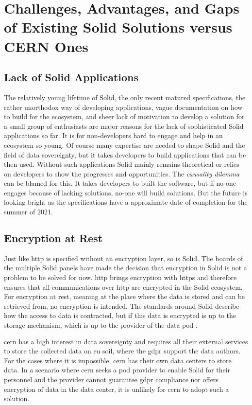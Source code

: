 \section{Challenges, Advantages, and Gaps of Existing Solid Solutions versus CERN Ones}

\subsection{Lack of Solid Applications}

The relatively young lifetime of Solid, the only recent matured specifications, the rather unorthodox way of developing applications, vague documentation on how to build for the ecosystem, and sheer lack of motivation to develop a solution for a small group of enthusiasts are major reasons for the lack of sophisticated Solid applications so far. It is for non-developers hard to engage and help in an ecosystem so young. Of course many expertise are needed to shape Solid and the field of data sovereignty, but it takes developers to build applications that can be then used. Without such applications Solid mainly remains theoretical or relies on developers to show the progresses and opportunities. The \textit{causality dilemma} can be blamed for this. It takes developers to built the software, but if no-one engages because of lacking solutions, no-one will build solutions. But the future is looking bright as the specifications have a approximate date of completion for the summer of 2021.

\subsection{Encryption at Rest}

Just like \gls{http} is specified without an encryption layer, so is Solid. The boards of the multiple Solid panels \cite{solid-panels} have made the decision that encryption in Solid is not a problem to be solved for now. \gls{http} brings encryption with \gls{https} and therefore ensures that all communications over \gls{http} are encrypted in the Solid ecosystem. For encryption at rest, meaning at the place where the data is stored and can be retrieved from, no encryption is intended. The standards around Solid describe how the access to data is contracted, but if this data is encrypted is up to the storage mechanism, which is up to the provider of the data pod \cite{solidproject-faqs}.

\gls{cern} has a high interest in data sovereignty and requires all their external services to store the collected data on \gls{eu} soil, where the \gls{gdpr} support the data authors. For the cases where it is impossible, \gls{cern} has their own data centers to store data. In a scenario where \gls{cern} seeks a pod provider to enable Solid for their personnel and the provider cannot guarantee \gls{gdpr} compliance nor offers encryption of data in the data center, it is unlikely for \gls{cern} to adopt such a solution.


